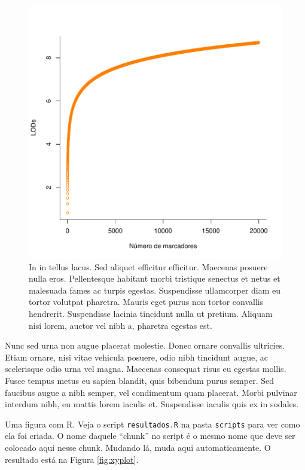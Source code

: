 \documentclass[book,A4paper,10pt,twoside,oldfontcommands]{memoir}\usepackage[]{graphicx}\usepackage[usenames,dvipsnames]{color}
\newenvironment{knitrout}{}{} %
\begin{document}
\begin{knitrout}
\color{fgcolor}\begin{figure}[htp]

{\centering \includegraphics[width=0.35\linewidth]{figuras/graphical_model} 

}

\caption[In in tellus lacus]{In in tellus lacus. Sed aliquet efficitur efficitur. Maecenas posuere nulla eros. Pellentesque habitant morbi tristique senectus et netus et malesuada fames ac turpis egestas. Suspendisse ullamcorper diam eu tortor volutpat pharetra. Mauris eget purus non tortor convallis hendrerit. Suspendisse lacinia tincidunt nulla ut pretium. Aliquam nisi lorem, auctor vel nibh a, pharetra egestas est.}\label{fig:fig1}
\end{figure}


\end{knitrout}

Nunc sed urna non augue placerat molestie. Donec ornare convallis
ultricies. Etiam ornare, nisi vitae vehicula posuere, odio nibh
tincidunt augue, ac scelerisque odio urna vel magna. Maecenas
consequat risus eu egestas mollis. Fusce tempus metus eu sapien
blandit, quis bibendum purus semper. Sed faucibus augue a nibh semper,
vel condimentum quam placerat. Morbi pulvinar interdum nibh, eu mattis
lorem iaculis et. Suspendisse iaculis quis ex in sodales.

Uma figura com R. Veja o script \texttt{resultados.R} na pasta
\texttt{scripts} para ver como ela foi criada. O nome daquele ``chunk''
no script é o mesmo nome que deve ser colocado aqui nesse chunk. Mudando
lá, muda aqui automaticamente. O resultado está na Figura
\ref{fig:xyplot}.
\end{document}
